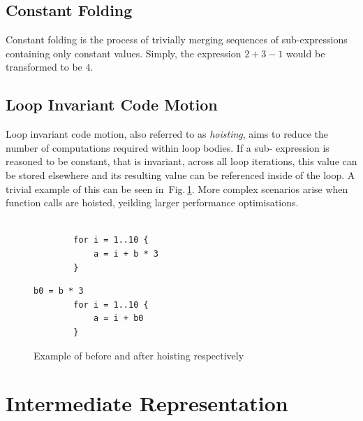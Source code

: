 \documentclass[12pt,openany,a4paper]{book}
\newcommand{\fig}[1]  {Fig.\,\ref{#1}}		%
\begin{document}
\subsection{Constant Folding}
\label{cf}

Constant folding is the process of trivially merging sequences of sub-expressions 
containing only constant values. Simply, the expression \(2 + 3 - 1\) would be 
transformed to be \(4\).

\subsection{Loop Invariant Code Motion}
\label{licm}

Loop invariant code motion, also referred to as \emph{hoisting}, aims to reduce
the number of computations required within loop bodies. If a sub-
expression is reasoned to be constant, that is invariant, across all loop iterations, 
this value can be stored elsewhere and its resulting value can be referenced inside of the
loop. A trivial example of this can be seen in~\fig{hoist}. More complex scenarios
arise when function calls are hoisted, yeilding larger performance optimisations.

\begin{figure}
    \begin{minipage}[l]{0.4\linewidth}
        \begin{lstlisting}[frame=single, basicstyle=\ttfamily\small, tabsize=1, columns=fullflexible]

        for i = 1..10 {
            a = i + b * 3
        }
        \end{lstlisting}
    \end{minipage}
    \hspace{0.18\textwidth}
    \begin{minipage}[l]{0.4\linewidth}
        \begin{lstlisting}[frame=single, basicstyle=\ttfamily\small, tabsize=1, columns=fullflexible]
        b0 = b * 3
        for i = 1..10 {
            a = i + b0
        }
        \end{lstlisting}
    \end{minipage}
    \caption{Example of before and after hoisting respectively}
    \label{hoist}
\end{figure}

\section{Intermediate Representation}
\label{ir}
\end{document}
